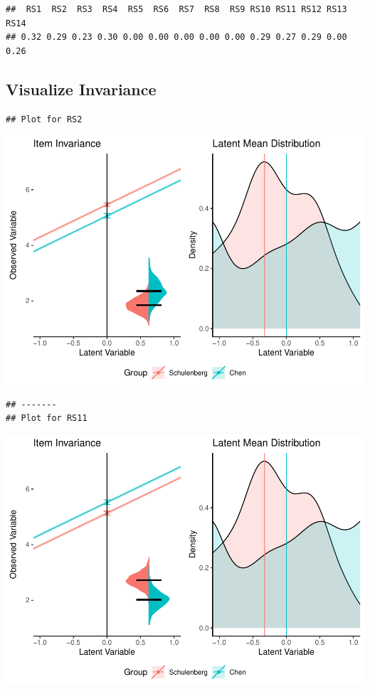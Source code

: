 \documentclass[
  man]{apa7}
\begin{document}
\begin{verbatim}
##  RS1  RS2  RS3  RS4  RS5  RS6  RS7  RS8  RS9 RS10 RS11 RS12 RS13 RS14 
## 0.32 0.29 0.23 0.30 0.00 0.00 0.00 0.00 0.00 0.29 0.27 0.29 0.00 0.26
\end{verbatim}

\hypertarget{visualize-invariance}{%
\subsection{Visualize Invariance}\label{visualize-invariance}}

\begin{verbatim}
## Plot for RS2
\end{verbatim}

\includegraphics{manuscript_files/figure-latex/unnamed-chunk-107-1.pdf}

\begin{verbatim}
## -------
## Plot for RS11
\end{verbatim}

\includegraphics{manuscript_files/figure-latex/unnamed-chunk-107-2.pdf}
\end{document}
